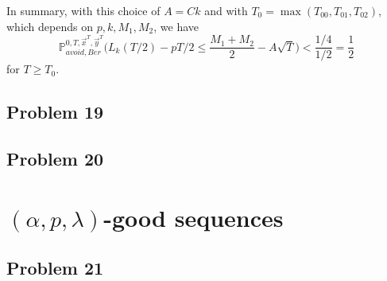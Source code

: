 \documentclass[12pt]{article}
\begin{document}
	In summary, with this choice of $A = Ck$ and with $T_0 = \max(T_{00}, T_{01}, T_{02})$, which depends on $p,k,M_1,M_2$, we have
	\[
	\mathbb{P}^{0,T,\vec{x}^T,\vec{y}^T}_{avoid, Ber} \Big( L_k(T/2) - pT/2 \leq \frac{M_1+M_2}{2} - A\sqrt{T} \Big) < \frac{1/4}{1/2} = \frac{1}{2}
	\]
	for $T\geq T_0$. 
	


\subsection*{Problem 19}


\subsection*{Problem 20}


\section{$(\alpha, p, \lambda)$-good sequences}

\subsection*{Problem 21}
\end{document}
